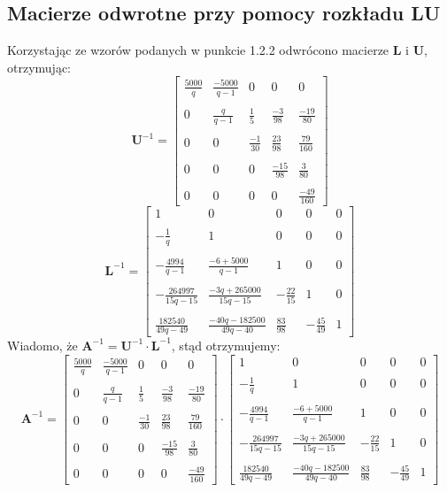 \documentclass[a4paper]{article}
\begin{document}
\subsection{Macierze odwrotne przy pomocy rozkładu LU}
Korzystając ze wzorów podanych w punkcie 1.2.2 odwrócono macierze \textbf{L} i \textbf{U}, otrzymując:
$$
\textbf{U}^{-1}=
\left[
\begin{array}
{ccccc}
\frac{5000}{q}&\frac{-5000}{q-1}&0&0&0\\ \\
0&\frac{q}{q-1}&\frac{1}{5}&\frac{-3}{98}&\frac{-19}{80}\\ \\
0&0&\frac{-1}{30}&\frac{23}{98}&\frac{79}{160}\\ \\
0&0&0&\frac{-15}{98}&\frac{3}{80}\\ \\
0&0&0&0&\frac{-49}{160}
\end{array}
\right]
$$
$$
\textbf{L}^{-1}=
\left[
\begin{array}
{ccccc}
1&0&0&0&0\\ \\
-\frac{1}{q}&1&0&0&0\\ \\
-\frac{4994}{q-1}&\frac{-6+5000}{q-1}&1&0&0\\ \\
-\frac{264997}{15q-15}&\frac{-3q+265000}{15q-15}&-\frac{22}{15}&1&0\\ \\
\frac{182540}{49q-49}&\frac{-40q-182500}{49q-40}&\frac{83}{98}&-\frac{45}{49}&1
\end{array}
\right]
$$
Wiadomo, że $\textbf{A}^{-1}=\textbf{U}^{-1}\cdot \textbf{L}^{-1}$, stąd otrzymujemy:
$$
\textbf{A}^{-1}=
\left[
\begin{array}
{ccccc}
\frac{5000}{q}&\frac{-5000}{q-1}&0&0&0\\ \\
0&\frac{q}{q-1}&\frac{1}{5}&\frac{-3}{98}&\frac{-19}{80}\\ \\
0&0&\frac{-1}{30}&\frac{23}{98}&\frac{79}{160}\\ \\
0&0&0&\frac{-15}{98}&\frac{3}{80}\\ \\
0&0&0&0&\frac{-49}{160}
\end{array}
\right]
\cdot
\left[
\begin{array}
{ccccc}
1&0&0&0&0\\ \\
-\frac{1}{q}&1&0&0&0\\ \\
-\frac{4994}{q-1}&\frac{-6+5000}{q-1}&1&0&0\\ \\
-\frac{264997}{15q-15}&\frac{-3q+265000}{15q-15}&-\frac{22}{15}&1&0\\ \\
\frac{182540}{49q-49}&\frac{-40q-182500}{49q-40}&\frac{83}{98}&-\frac{45}{49}&1
\end{array}
\right]
$$
\end{document}
